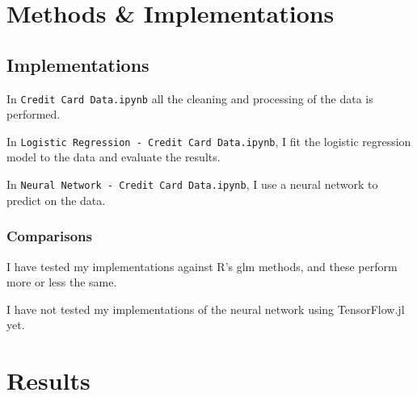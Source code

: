 \documentclass[]{article}
\begin{document}
\section{Methods \& Implementations}\label{methods-implementations}

\subsection{Implementations}\label{implementations}

In \texttt{Credit\ Card\ Data.ipynb} all the cleaning and processing of
the data is performed.

In \texttt{Logistic\ Regression\ -\ Credit\ Card\ Data.ipynb}, I fit the
logistic regression model to the data and evaluate the results.

In \texttt{Neural\ Network\ -\ Credit\ Card\ Data.ipynb}, I use a neural
network to predict on the data.

\subsubsection{Comparisons}\label{comparisons}

I have tested my implementations against R's glm methods, and these
perform more or less the same.

I have not tested my implementations of the neural network using
TensorFlow.jl yet.

\section{Results}\label{results}
\end{document}
